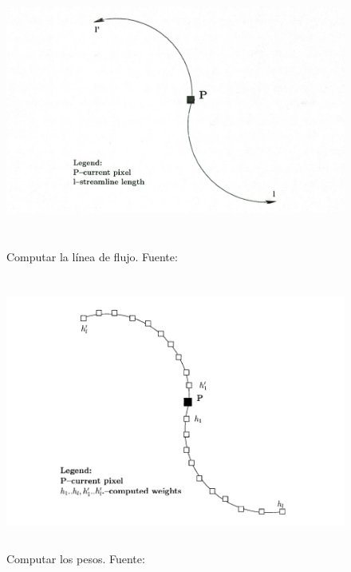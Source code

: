 \begin{figure}
		\centering
		\includegraphics[height=9cm]{figures/licstreamline.png}
		\caption[Computar la línea de flujo.]{Computar la línea de flujo.
		Fuente:~\cite{licthesis}}	
		\label{fig:licstreamline}
\end{figure}

\begin{figure}
		\centering
		\includegraphics[height=9cm]{figures/licweights.png}
		\caption[Computar los pesos.]{Computar los pesos.
		Fuente:~\cite{licthesis}}	
		\label{fig:licweights}
\end{figure}

